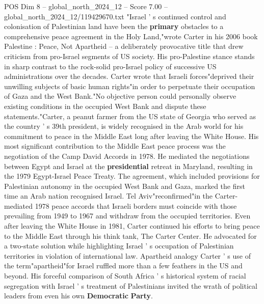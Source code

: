 \begin{textsample}{POS Dim 8 – global\_north\_2024\_12 – Score 7.00 – global\_north\_2024\_12/119429670.txt}  \label{ex:f8_pos_341}
"Israel ' s continued control and colonisation of Palestinian land have been the \textbf{primary} obstacles to a comprehensive peace agreement in the Holy Land,"wrote Carter in his 2006 book Palestine : Peace, Not Apartheid -- a deliberately provocative title that drew criticism from pro-Israel segments of US society.
His pro-Palestine stance stands in sharp contrast to the rock-solid pro-Israel policy of successive US administrations over the decades.
Carter wrote that Israeli forces"deprived their unwilling subjects of basic human rights"in order to perpetuate their occupation of Gaza and the West Bank."No objective person could personally observe existing conditions in the occupied West Bank and dispute these statements."Carter, a peanut farmer from the US state of Georgia who served as the country ' s 39th president, is widely recognised in the Arab world for his commitment to peace in the Middle East long after leaving the White House.
His most significant contribution to the Middle East peace process was the negotiation of the Camp David Accords in 1978.
He mediated the negotiations between Egypt and Israel at the \textbf{presidential} retreat in Maryland, resulting in the 1979 Egypt-Israel Peace Treaty.
The agreement, which included provisions for Palestinian autonomy in the occupied West Bank and Gaza, marked the first time an Arab nation recognised Israel.
Tel Aviv"reconfirmed"in the Carter-mediated 1978 peace accords that Israeli borders must coincide with those prevailing from 1949 to 1967 and withdraw from the occupied territories.
Even after leaving the White House in 1981, Carter continued his efforts to bring peace to the Middle East through his think tank, The Carter Center.
He advocated for a two-state solution while highlighting Israel ' s occupation of Palestinian territories in violation of international law.
Apartheid analogy Carter ' s use of the term"apartheid"for Israel ruffled more than a few feathers in the US and beyond.
His forceful comparison of South Africa ' s historical system of racial segregation with Israel ' s treatment of Palestinians invited the wrath of political leaders from even his own \textbf{Democratic} \textbf{Party}.

\end{textsample}
